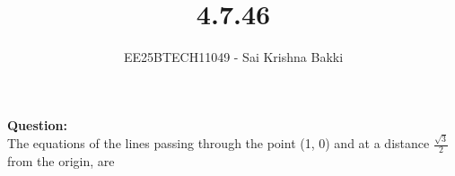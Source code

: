\documentclass[journal]{IEEEtran}
\begin{document}

\vspace{3cm}

\title{4.7.46}
\author{EE25BTECH11049 - Sai Krishna Bakki}
 \maketitle
{\let\newpage\relax\maketitle}

\renewcommand{\thefigure}{\theenumi}
\renewcommand{\thetable}{\theenumi}
\setlength{\intextsep}{10pt} %


\renewcommand{\thetable}{\theenumi}
\textbf{Question:}\\
The equations of the lines passing through the point (1, 0) and at a distance $\frac{\sqrt{3}}{2}$ from the origin, are \\
\end{document}
